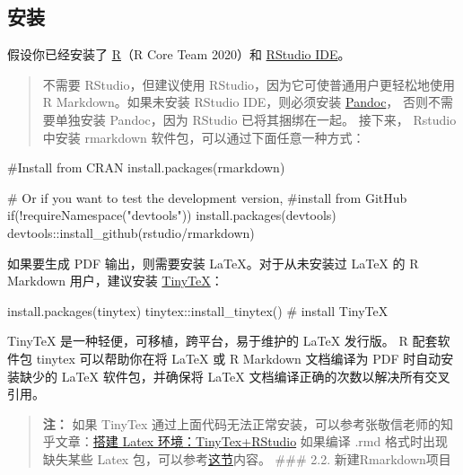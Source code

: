 \documentclass[
]{book}
\newenvironment{Shaded}{\begin{snugshade}}{\end{snugshade}}
\newcommand{\FunctionTok}[1]{\textcolor[rgb]{0.00,0.00,0.00}{#1}}
\newcommand{\NormalTok}[1]{#1}
\begin{document}
\hypertarget{ux5b89ux88c5}{%
\subsection{安装}\label{ux5b89ux88c5}}

假设你已经安装了 \href{https://www.r-project.org}{R}（R Core Team
2020）和 \href{https://www.rstudio.com}{RStudio IDE}。

\begin{quote}
不需要 RStudio，但建议使用 RStudio，因为它可使普通用户更轻松地使用 R
Markdown。如果未安装 RStudio IDE，则必须安装
\href{http://pandoc.org}{Pandoc}， 否则不需要单独安装 Pandoc，因为 RStudio
已将其捆绑在一起。 接下来， Rstudio 中安装 rmarkdown
软件包，可以通过下面任意一种方式：
\end{quote}

\begin{Shaded}
\begin{Highlighting}[]
\NormalTok{\#Install from CRAN  }
\NormalTok{install.packages(\textquotesingle{}rmarkdown\textquotesingle{})  }
  
\FunctionTok{\# Or if you want to test the development version,  }
\NormalTok{\#install from GitHub  }
\NormalTok{if(!requireNamespace("devtools"))  }
\NormalTok{install.packages(\textquotesingle{}devtools\textquotesingle{})  }
\NormalTok{devtools::install\_github(\textquotesingle{}rstudio/rmarkdown\textquotesingle{})  }
\end{Highlighting}
\end{Shaded}

如果要生成 PDF 输出，则需要安装 LaTeX。对于从未安装过 LaTeX 的 R
Markdown 用户，建议安装
\href{https://yihui.name/tinytex/}{TinyTeX}：

\begin{Shaded}
\begin{Highlighting}[]
\NormalTok{install.packages(\textquotesingle{}tinytex\textquotesingle{})  }
\NormalTok{tinytex::install\_tinytex() \# install TinyTeX  }
\end{Highlighting}
\end{Shaded}

TinyTeX 是一种轻便，可移植，跨平台，易于维护的 LaTeX 发行版。 R
配套软件包 tinytex 可以帮助你在将 LaTeX 或 R Markdown 文档编译为 PDF
时自动安装缺少的 LaTeX 软件包，并确保将 LaTeX
文档编译正确的次数以解决所有交叉引用。

\begin{quote}
\textbf{注：} 如果 TinyTex
通过上面代码无法正常安装，可以参考张敬信老师的知乎文章：\href{https://zhuanlan.zhihu.com/p/328585804}{搭建 Latex
环境：TinyTex+RStudio}
如果编译 .rmd 格式时出现缺失某些 Latex
包，可以参考\href{https://bookdown.org/yihui/rmarkdown-cookbook/install-latex-pkgs.html}{这节}内容。
\#\#\# 2.2. 新建Rmarkdown项目
\end{quote}
\end{document}
